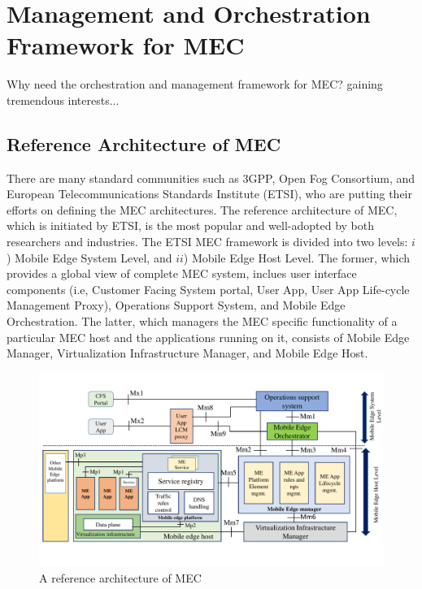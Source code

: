 \section{Management and Orchestration Framework for MEC} \label{framework}

Why need the orchestration and management framework for MEC? gaining tremendous interests...


\subsection{Reference Architecture of MEC}

There are many standard communities such as 3GPP, Open Fog Consortium, and European Telecommunications Standards Institute (ETSI), who are putting their efforts on defining the MEC architectures. 
The reference architecture of MEC, which is initiated by ETSI, is the most popular and well-adopted by both researchers and industries. The ETSI MEC framework is divided into two levels: $i$) Mobile Edge System Level, and $ii$) Mobile Edge Host Level. The former, which provides a global view of complete MEC system, inclues user interface components (i.e, Customer Facing System portal, User App, User App Life-cycle Management Proxy), Operations Support System, and Mobile Edge Orchestration. The latter, which managers the MEC specific functionality of a particular MEC host and the applications running on it, consists of Mobile Edge Manager, Virtualization Infrastructure Manager, and Mobile Edge Host.


\begin{figure}[H]
  \begin{center}
   \includegraphics[width=14cm]{./figures/book-etsi-mec.pdf}
   \caption{A reference architecture of MEC}
   \label{fig:etsi-mec}
   \end{center}
\end{figure}


